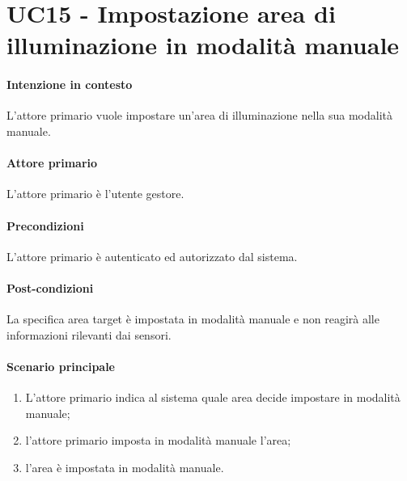 \section{UC15 - Impostazione area di illuminazione in modalità manuale}\label{uc:15}
\paragraph{Intenzione in contesto} L'attore primario vuole impostare un'area di illuminazione nella sua modalità manuale.
\paragraph{Attore primario} L'attore primario è l'utente gestore.
\paragraph{Precondizioni}  L'attore primario è autenticato ed autorizzato dal sistema.
\paragraph{Post-condizioni} La specifica area target è impostata in modalità manuale e non reagirà alle informazioni rilevanti dai sensori.
\paragraph{Scenario principale}
\begin{enumerate}
    \item L'attore primario indica al sistema quale area decide impostare in modalità manuale;
    \item l'attore primario imposta in modalità manuale l'area;
    \item l'area è impostata in modalità manuale.
\end{enumerate}